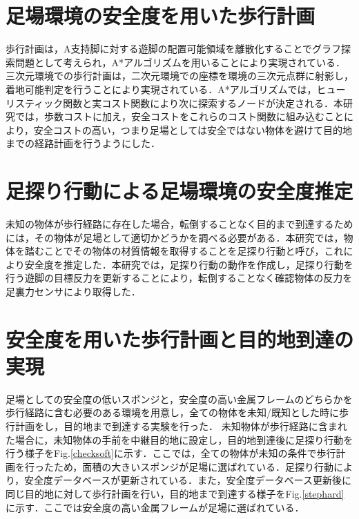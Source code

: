\documentclass[twocolumn]{preport}
\renewcommand{\figref}[1]{Fig.\ref{#1}}
\begin{document}
\section{足場環境の安全度を用いた歩行計画}
歩行計画は，A支持脚に対する遊脚の配置可能領域を離散化することでグラフ探索問題として考えられ，A*アルゴリズムを用いることにより実現されている．三次元環境での歩行計画は，二次元環境での座標を環境の三次元点群に射影し，着地可能判定を行うことにより実現されている．A*アルゴリズムでは，ヒューリスティック関数と実コスト関数により次に探索するノードが決定される．本研究では，歩数コストに加え，安全コストをこれらのコスト関数に組み込むことにより，安全コストの高い，つまり足場としては安全ではない物体を避けて目的地までの経路計画を行うようにした．

\section{足探り行動による足場環境の安全度推定}
未知の物体が歩行経路に存在した場合，転倒することなく目的まで到達するためには，その物体が足場として適切かどうかを調べる必要がある．本研究では，物体を踏むことでその物体の材質情報を取得することを足探り行動と呼び，これにより安全度を推定した．本研究では，足探り行動の動作を作成し，足探り行動を行う遊脚の目標反力を更新することにより，転倒することなく確認物体の反力を足裏力センサにより取得した．

\section{安全度を用いた歩行計画と目的地到達の実現}
足場としての安全度の低いスポンジと，安全度の高い金属フレームのどちらかを歩行経路に含む必要のある環境を用意し，全ての物体を未知/既知とした時に歩行計画をし，目的地まで到達する実験を行った．
未知物体が歩行経路に含まれた場合に，未知物体の手前を中継目的地に設定し，目的地到達後に足探り行動を行う様子を\figref{checksoft}に示す．ここでは，全ての物体が未知の条件で歩行計画を行ったため，面積の大きいスポンジが足場に選ばれている．足探り行動により，安全度データベースが更新されている．また，安全度データベース更新後に同じ目的地に対して歩行計画を行い，目的地まで到達する様子を\figref{stephard}に示す．ここでは安全度の高い金属フレームが足場に選ばれている．
\end{document}

